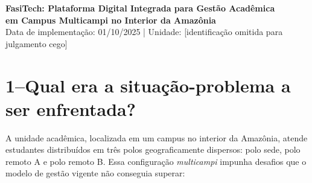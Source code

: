 \documentclass[12pt,a4paper]{article}
\begin{document}

\begin{center}
  {\large\bfseries\color{ufpablue}
    FasiTech: Plataforma Digital Integrada para Gestão Acadêmica\\[3pt]
    em Campus Multicampi no Interior da Amazônia}\\[6pt]
  {\small Data de implementação: 01/10/2025 \quad|\quad
   Unidade: [identificação omitida para julgamento cego]}
\end{center}


\section{1\;–\;Qual era a situação-problema a ser enfrentada?}

A unidade acadêmica, localizada em um campus no interior da Amazônia, atende
estudantes distribuídos em três polos geograficamente dispersos: polo sede, polo remoto A
e polo remoto B. Essa configuração \textit{multicampi} impunha desafios que o modelo de
gestão vigente não conseguia superar:
\end{document}
